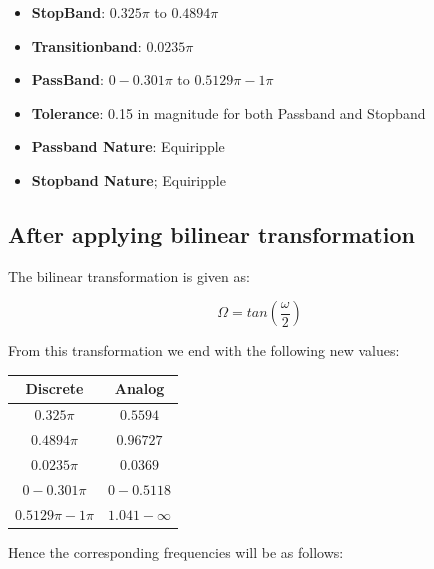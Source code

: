 \documentclass[12pt, letterpaper,]{article}
\begin{document}
\begin{itemize}

\item \textbf{StopBand}: $0.325\pi$ to $0.4894\pi$

\item \textbf{Transitionband}: $0.0235\pi$

\item \textbf{PassBand}: $0 - 0.301\pi$ to $0.5129\pi - 1\pi$

\item \textbf{Tolerance}: 0.15 in magnitude for both Passband and Stopband

\item \textbf{Passband Nature}: Equiripple

\item \textbf{Stopband Nature}; Equiripple

\end{itemize}
 
 \subsection{After applying bilinear transformation}

 The bilinear transformation is given as:

 \begin{equation}
     \Omega = tan(\frac{\omega}{2})
 \end{equation}

 From this transformation we end with the following new values:
\begin{table}[!h]
    \centering

\begin{tabular}{|c|c|}
\hline
Discrete & Analog \\
\hline
$0.325\pi$ & $0.5594$ \\
$0.4894\pi$ & $0.96727$ \\
$0.0235\pi$ & $0.0369$ \\
$0 - 0.301\pi$ & $0 - 0.5118$\\
$0.5129\pi - 1\pi$ & $1.041 - \infty$ \\
\hline
\end{tabular}

\end{table}

Hence the corresponding frequencies will be as follows:
\end{document}
